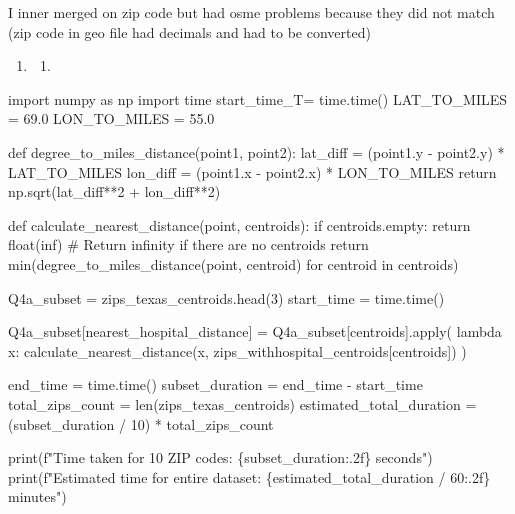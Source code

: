 \documentclass[
  letterpaper,
  DIV=11,
  numbers=noendperiod]{scrartcl}
\newenvironment{Shaded}{\begin{snugshade}}{\end{snugshade}}
\newcommand{\NormalTok}[1]{\textcolor[rgb]{0.00,0.23,0.31}{#1}}
\providecommand{\tightlist}{%
  \setlength{\itemsep}{0pt}\setlength{\parskip}{0pt}}\usepackage{longtable,booktabs,array}
\begin{document}
I inner merged on zip code but had osme problems because they did not
match (zip code in geo file had decimals and had to be converted)

\begin{enumerate}
\def\labelenumi{\arabic{enumi}.}
\setcounter{enumi}{3}
\tightlist
\item
  \begin{enumerate}
  \def\labelenumii{\alph{enumii}.}
  \tightlist
  \item
  \end{enumerate}
\end{enumerate}

\begin{Shaded}
\begin{Highlighting}[]
\NormalTok{import numpy as np}
\NormalTok{import time}
\NormalTok{start\_time\_T= time.time()}
\NormalTok{LAT\_TO\_MILES = 69.0  }
\NormalTok{LON\_TO\_MILES = 55.0 }

\NormalTok{def degree\_to\_miles\_distance(point1, point2):}
\NormalTok{    lat\_diff = (point1.y {-} point2.y) * LAT\_TO\_MILES}
\NormalTok{    lon\_diff = (point1.x {-} point2.x) * LON\_TO\_MILES}
\NormalTok{    return np.sqrt(lat\_diff**2 + lon\_diff**2)}

\NormalTok{def calculate\_nearest\_distance(point, centroids):}
\NormalTok{    if centroids.empty:}
\NormalTok{        return float(\textquotesingle{}inf\textquotesingle{})  \# Return infinity if there are no centroids}
\NormalTok{    return min(degree\_to\_miles\_distance(point, centroid) for centroid in centroids)}

\NormalTok{Q4a\_subset = zips\_texas\_centroids.head(3)}
\NormalTok{start\_time = time.time()}

\NormalTok{Q4a\_subset[\textquotesingle{}nearest\_hospital\_distance\textquotesingle{}] = Q4a\_subset[\textquotesingle{}centroids\textquotesingle{}].apply(}
\NormalTok{    lambda x: calculate\_nearest\_distance(x, zips\_withhospital\_centroids[\textquotesingle{}centroids\textquotesingle{}])}
\NormalTok{)}

\NormalTok{end\_time = time.time()}
\NormalTok{subset\_duration = end\_time {-} start\_time}
\NormalTok{total\_zips\_count = len(zips\_texas\_centroids)}
\NormalTok{estimated\_total\_duration = (subset\_duration / 10) * total\_zips\_count}

\NormalTok{print(f"Time taken for 10 ZIP codes: \{subset\_duration:.2f\} seconds")}
\NormalTok{print(f"Estimated time for entire dataset: \{estimated\_total\_duration / 60:.2f\} minutes")}
\end{Highlighting}
\end{Shaded}
\end{document}

